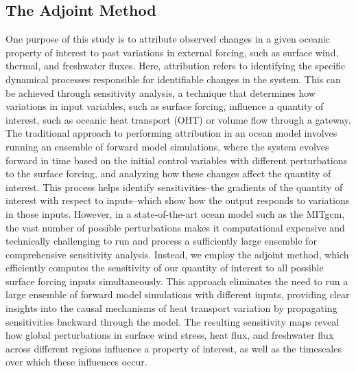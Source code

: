 \documentclass[draft]{agujournal2019}
\begin{document}
\subsection{The Adjoint Method}

One purpose of this study is to attribute observed changes in a given oceanic property of interest to past variations in external forcing, such as surface wind, thermal, and freshwater fluxes. Here, attribution refers to identifying the specific dynamical processes responsible for identifiable changes in the system. This can be achieved through sensitivity analysis, a technique that determines how variations in input variables, such as surface forcing, influence a quantity of interest, such as oceanic heat transport (OHT) or volume flow through a gateway. The traditional approach to performing attribution in an ocean model involves running an ensemble of forward model simulations, where the system evolves forward in time based on the initial control variables with different perturbations to the surface forcing, and analyzing how these changes affect the quantity of interest. This process helps identify sensitivities--the gradients of the quantity of interest with respect to inputs--which show how the output responds to variations in those inputs. However, in a state-of-the-art ocean model such as the MITgcm, the vast number of possible perturbations makes it computational expensive and technically challenging to run and process a sufficiently large ensemble for comprehensive sensitivity analysis. Instead, we employ the adjoint method, which efficiently computes the sensitivity of our quantity of interest to all possible surface forcing inputs simultaneously. This approach eliminates the need to run a large ensemble of forward model simulations with different inputs, providing clear insights into the causal mechanisms of heat transport variation by propagating sensitivities backward through the model. The resulting sensitivity maps reveal how global perturbations in surface wind stress, heat flux, and freshwater flux across different regions influence a property of interest, as well as the timescales over which these influences occur.

\end{document}
